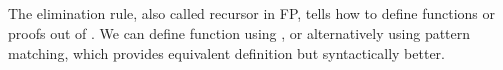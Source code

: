 \begin{code}
\AgdaSymbol{(}\AgdaSpace{}%
\AgdaSymbol{))}\AgdaSpace{}%
\AgdaSpace{}%
\AgdaBound{\AgdaUnderscore{}}\AgdaSpace{}%
\AgdaSpace{}%
\AgdaSpace{}%
\AgdaSpace{}%
\AgdaSymbol{)}\<%
\\
%
\\[\AgdaEmptyExtraSkip]%
\>[0]\AgdaSpace{}%
\AgdaSymbol{:}\AgdaSpace{}%
\AgdaSpace{}%
\AgdaSpace{}%
\<%
\\
\>[0]\AgdaSpace{}%
\AgdaSpace{}%
\AgdaSymbol{=}\AgdaSpace{}%
\AgdaSpace{}%
\AgdaSymbol{(}\AgdaSpace{}%
\AgdaSymbol{)}\<%
\\
\>[0]\AgdaSpace{}%
\AgdaSpace{}%
\AgdaSpace{}%
\AgdaSymbol{=}\AgdaSpace{}%
\AgdaSpace{}%
\AgdaSymbol{(}\AgdaSpace{}%
\AgdaSymbol{)}\<%
\end{code}

The elimination rule, also called recursor in FP, tells how to define functions or proofs out of . We can define function  using , or alternatively using pattern matching, which provides equivalent definition but syntactically better.

